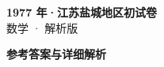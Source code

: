 \documentclass[zihao=-4, a4paper]{ctexart}
\begin{document}
\begin{center}
  {\Large\bfseries 1977 年·江苏盐城地区初试卷}\\[4pt]
  {\large 数学 · 解析版}
\end{center}
\medskip
{}

\clearpage
{}
\begin{center}{\Large\bfseries 参考答案与详细解析}\end{center}
\medskip

\end{document}
